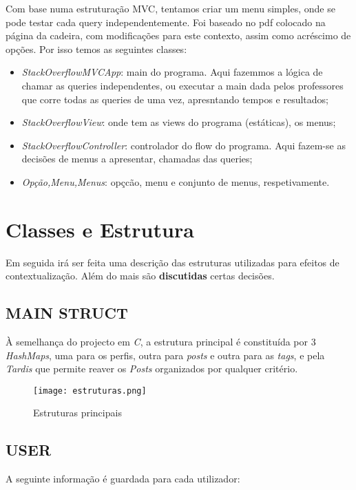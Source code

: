 \documentclass[letterpaper, 10 pt, conference]{IEEEtran} %
\begin{document}
Com base numa estruturação MVC, tentamos criar um menu simples, onde se pode testar cada query independentemente. Foi baseado no pdf colocado na página da cadeira,
com modificações para este contexto, assim como acréscimo de opções.
Por isso temos as seguintes classes:
\begin{itemize}
    \item \textit{StackOverflowMVCApp}: main do programa. Aqui fazemmos a lógica de chamar as queries independentes, ou executar a main dada pelos professores que corre todas as queries de uma vez, apresntando tempos e resultados;
    \item \textit{StackOverflowView}: onde tem as views do programa (estáticas), os menus;
    \item \textit{StackOverflowController}: controlador do flow do programa. Aqui fazem-se as decisões de menus a apresentar, chamadas das queries;
    \item \textit{Opção,Menu,Menus}: opçcão, menu e conjunto de menus, respetivamente.
\end{itemize}

\section{Classes e Estrutura}

Em seguida irá ser feita uma descrição das estruturas utilizadas para efeitos de contextualização. Além do mais são \textbf{discutidas} certas decisões.

\subsection{MAIN STRUCT}
À semelhança do projecto em \textit{C}, a estrutura principal é constituída por 3 \textit{HashMaps}, uma para os perfis, outra para \textit{posts} e outra para as \textit{tags}, e pela \textit{Tardis} que permite reaver os \textit{Posts} organizados por qualquer critério.
\newline

\begin{figure}[h!]
  \centering
  \texttt{[image: estruturas.png]}
   \caption{Estruturas principais}
\end{figure}

\subsection{USER}
A seguinte informação é guardada para cada utilizador:
\newline
\end{document}
